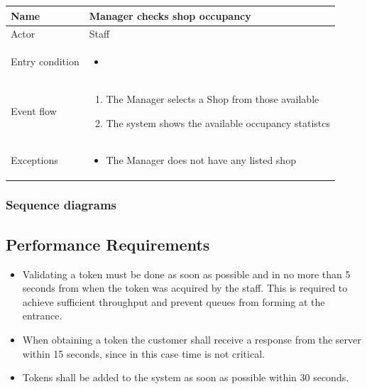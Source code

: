 \begin{table}[H]
    \begin{tabu} to \textwidth {|X|X[4]|}
        \hline
        Name            & Manager checks shop occupancy \\ \hline
        Actor           & Staff                         \\ \hline
        Entry condition & \begin{itemize}
            \item {}
        \end{itemize}    \\ \hline
        Event flow      & \begin{enumerate}
            \item The Manager selects a Shop from those available
            \item The system shows the available occupancy statistcs
        \end{enumerate}    \\ \hline
        Exceptions      & \begin{itemize}
            \item The Manager does not have any listed shop
        \end{itemize}    \\ \hline
    \end{tabu}
\end{table}

\subsubsection{Sequence diagrams}

%     
\subsection{Performance Requirements}
\begin{itemize}
    \item Validating a token must be done as soon as possible and in no more than 5 seconds from when the token was acquired by the staff. This is required to achieve sufficient throughput and prevent queues from forming at the entrance.
    \item When obtaining a token the customer shall receive a response from the server within 15 seconds, since in this case time is not critical.
    \item Tokens shall be added to the system as soon as possible within 30 seconds.
\end{itemize}
